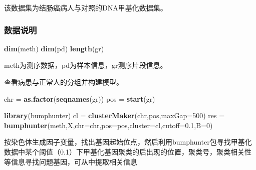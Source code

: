 \documentclass[]{book}
\newenvironment{Shaded}{\begin{snugshade}}{\end{snugshade}}
\newcommand{\DataTypeTok}[1]{\textcolor[rgb]{0.13,0.29,0.53}{#1}}
\newcommand{\DecValTok}[1]{\textcolor[rgb]{0.00,0.00,0.81}{#1}}
\newcommand{\FloatTok}[1]{\textcolor[rgb]{0.00,0.00,0.81}{#1}}
\newcommand{\KeywordTok}[1]{\textcolor[rgb]{0.13,0.29,0.53}{\textbf{#1}}}
\newcommand{\NormalTok}[1]{#1}
\newcommand{\OperatorTok}[1]{\textcolor[rgb]{0.81,0.36,0.00}{\textbf{#1}}}
\newcommand{\StringTok}[1]{\textcolor[rgb]{0.31,0.60,0.02}{#1}}
\begin{document}
该数据集为结肠癌病人与对照的DNA甲基化数据集。

\hypertarget{ux6570ux636eux8bf4ux660e}{%
\subsubsection{数据说明}\label{ux6570ux636eux8bf4ux660e}}

\begin{Shaded}
\begin{Highlighting}[]
\KeywordTok{dim}\NormalTok{(meth)}
\KeywordTok{dim}\NormalTok{(pd)}
\KeywordTok{length}\NormalTok{(gr)}
\end{Highlighting}
\end{Shaded}

meth为测序数据，pd为样本信息，gr测序片段信息。

\begin{Shaded}
\end{Shaded}

查看病患与正常人的分组并构建模型。

\begin{Shaded}
\begin{Highlighting}[]
\NormalTok{chr =}\StringTok{ }\KeywordTok{as.factor}\NormalTok{(}\KeywordTok{seqnames}\NormalTok{(gr))}
\NormalTok{pos =}\StringTok{ }\KeywordTok{start}\NormalTok{(gr)}

\KeywordTok{library}\NormalTok{(bumphunter)}
\NormalTok{cl =}\StringTok{ }\KeywordTok{clusterMaker}\NormalTok{(chr,pos,}\DataTypeTok{maxGap=}\DecValTok{500}\NormalTok{)}
\NormalTok{res =}\StringTok{ }\KeywordTok{bumphunter}\NormalTok{(meth,X,}\DataTypeTok{chr=}\NormalTok{chr,}\DataTypeTok{pos=}\NormalTok{pos,}\DataTypeTok{cluster=}\NormalTok{cl,}\DataTypeTok{cutoff=}\FloatTok{0.1}\NormalTok{,}\DataTypeTok{B=}\DecValTok{0}\NormalTok{)}
\end{Highlighting}
\end{Shaded}

按染色体生成因子变量，找出基因起始位点，然后利用bumphunter包寻找甲基化数据中某个阈值（0.1）下甲基化基因聚类的后出现的位置，聚类号，聚类相关性等信息寻找问题基因，可从中提取相关信息
\end{document}

